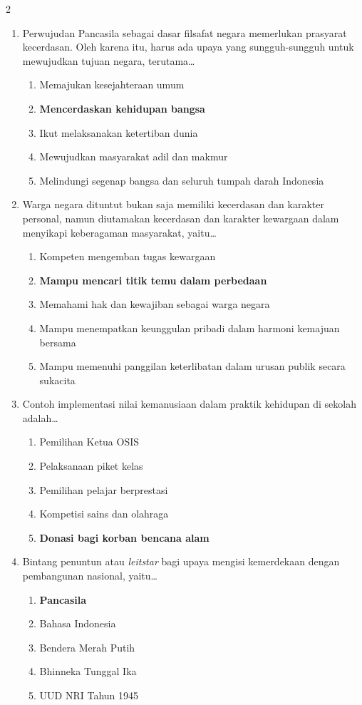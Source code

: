 \documentclass[10pt,a4paper]{article}
\begin{document}
\begin{multicols}{2}
\begin{enumerate}
  \item Perwujudan Pancasila sebagai dasar filsafat negara memerlukan prasyarat kecerdasan. Oleh karena itu, harus ada upaya yang sungguh-sungguh untuk mewujudkan tujuan negara, terutama\dots
    \begin{enumerate}
    \item Memajukan kesejahteraan umum
    \item \textbf{Mencerdaskan kehidupan bangsa}
    \item Ikut melaksanakan ketertiban dunia
    \item Mewujudkan masyarakat adil dan makmur
    \item Melindungi segenap bangsa dan seluruh tumpah darah Indonesia
    \end{enumerate}

  \item Warga negara dituntut bukan saja memiliki kecerdasan dan karakter personal, namun diutamakan kecerdasan dan karakter kewargaan dalam menyikapi keberagaman masyarakat, yaitu\dots
    \begin{enumerate}
    \item Kompeten mengemban tugas kewargaan
    \item \textbf{Mampu mencari titik temu dalam perbedaan}
    \item Memahami hak dan kewajiban sebagai warga negara
    \item Mampu menempatkan keunggulan pribadi dalam harmoni kemajuan bersama
    \item Mampu memenuhi panggilan keterlibatan dalam urusan publik secara sukacita
    \end{enumerate}

  \item Contoh implementasi nilai kemanusiaan dalam praktik kehidupan di sekolah adalah\dots
    \begin{enumerate}
    \item Pemilihan Ketua OSIS
    \item Pelaksanaan piket kelas
    \item Pemilihan pelajar berprestasi
    \item Kompetisi sains dan olahraga
    \item \textbf{Donasi bagi korban bencana alam}
    \end{enumerate}

  \item Bintang penuntun atau \textit{leitstar} bagi upaya mengisi kemerdekaan dengan pembangunan nasional, yaitu\dots
    \begin{enumerate}
    \item \textbf{Pancasila}
    \item Bahasa Indonesia
    \item Bendera Merah Putih
    \item Bhinneka Tunggal Ika
    \item UUD NRI Tahun 1945
    \end{enumerate}


\end{enumerate}
\end{multicols}
\end{document}
